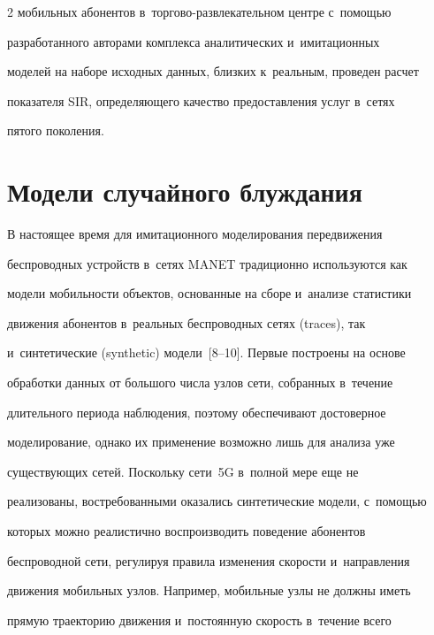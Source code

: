 \begin{multicols}{2}
мобильных абонентов в~тор\-го\-во-раз\-вле\-ка\-тель\-ном центре с~по\-мощью 

разработанного авторами комплекса аналитических и~имитационных 

моделей на наборе исходных данных, близ\-ких к~реальным, проведен расчет 

показателя SIR, определяющего качество пред\-остав\-ле\-ния услуг в~сетях 

пятого поколения.



\vspace*{-8pt}



\section{Модели случайного блуждания}



\vspace*{-2pt}



  В настоящее время для имитационного моделирования передвижения 

беспроводных устройств в~сетях MANET традиционно используются как 

модели мо\-биль\-ности объектов, основанные на сборе и~анализе статистики 

движения абонентов в~реальных беспроводных сетях (traces), так 

и~синтетические (synthetic) модели~[8--10]. Первые построены на основе 

обработки данных от большого чис\-ла узлов сети, со\-бран\-ных в~течение 

длительного периода наблюдения, поэтому обеспечивают достоверное 

моделирование, однако их применение возможно лишь для анализа уже 

су\-ще\-ст\-ву\-ющих сетей. Поскольку сети~5G в~полной мере еще не 

реализованы, востребованными оказались синтетические модели, с~помощью 

которых мож\-но реалистично воспроизводить поведение абонентов 

беспроводной сети, регулируя правила изменения ско\-рости и~на\-прав\-ле\-ния 

движения мобильных узлов. Например, мобильные узлы не долж\-ны иметь 

прямую траекторию движения и~постоянную ско\-рость в~течение всего 


\end{multicols}
